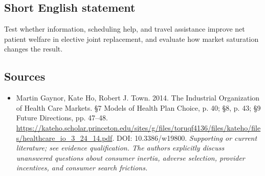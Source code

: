 \documentclass[11pt]{article}
\begin{document}
\subsection{Short English statement}
Test whether information, scheduling help, and travel assistance improve net patient welfare in elective joint replacement, and evaluate how market saturation changes the result.

\subsection{Sources}
\begin{itemize}\raggedright
\item[\textnormal{[S1]}]\hypertarget{source:30007726:1}{} Martin Gaynor, Kate Ho, Robert J. Town. 2014. The Industrial Organization of Health Care Markets. §7 Models of Health Plan Choice, p. 40; §8, p. 43; §9 Future Directions, pp. 47–48.
\url{https://kateho.scholar.princeton.edu/sites/g/files/toruqf4136/files/kateho/files/healthcare_io_3_24_14.pdf}.
DOI: 10.3386/w19800.
{\small\textit{Supporting or current literature; see evidence qualification. The authors explicitly discuss unanswered questions about consumer inertia, adverse selection, provider incentives, and consumer search frictions.}}
\end{itemize}
\end{document}
